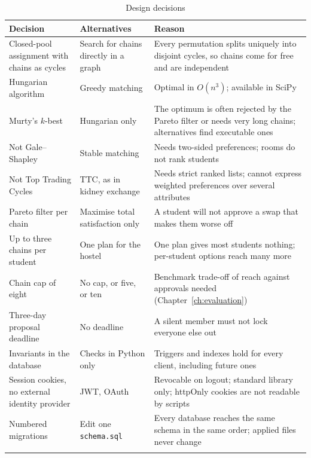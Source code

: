 \begin{longtable}{>{\raggedright\arraybackslash}p{} >{\raggedright\arraybackslash}p{} >{\raggedright\arraybackslash}p{}}
\toprule
\textbf{Decision} & \textbf{Alternatives} & \textbf{Reason} \\
\midrule
\endhead
Closed-pool assignment with chains as cycles & Search for chains directly in a graph & Every permutation splits uniquely into disjoint cycles, so chains come for free and are independent \\
Hungarian algorithm \cite{kuhn1955hungarian} & Greedy matching & Optimal in $O(n^3)$; available in SciPy \cite{virtanen2020scipy} \\
Murty's $k$-best \cite{murty1968ranking} & Hungarian only & The optimum is often rejected by the Pareto filter or needs very long chains; alternatives find executable ones \\
Not Gale--Shapley \cite{gale1962college} & Stable matching & Needs two-sided preferences; rooms do not rank students \\
Not Top Trading Cycles \cite{shapley1974cores} & TTC, as in kidney exchange \cite{roth2004kidney} & Needs strict ranked lists; cannot express weighted preferences over several attributes \\
Pareto filter per chain & Maximise total satisfaction only & A student will not approve a swap that makes them worse off \\
Up to three chains per student & One plan for the hostel & One plan gives most students nothing; per-student options reach many more \\
Chain cap of eight & No cap, or five, or ten & Benchmark trade-off of reach against approvals needed (Chapter~\ref{ch:evaluation}) \\
Three-day proposal deadline & No deadline & A silent member must not lock everyone else out \\
Invariants in the database & Checks in Python only & Triggers and indexes hold for every client, including future ones \\
Session cookies, no external identity provider & JWT, OAuth & Revocable on logout; standard library only; httpOnly cookies are not readable by scripts \\
Numbered migrations & Edit one \texttt{schema.sql} & Every database reaches the same schema in the same order; applied files never change \\
\bottomrule
\caption{Design decisions}
\label{tab:decisions}
\end{longtable}
